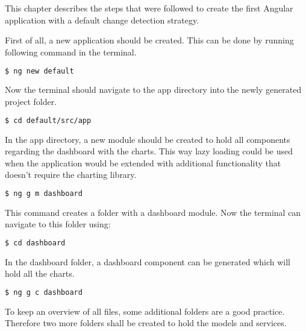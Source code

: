 
\chapter{}
\label{ch:default}

This chapter describes the steps that were followed to create the first Angular application with a default change detection strategy.

First of all, a new application should be created. This can be done by running following command in the terminal.
\begin{lstlisting}[language=bash]
$ ng new default
\end{lstlisting}

Now the terminal should navigate to the app directory into the newly generated project folder.

\begin{lstlisting}[language=bash]
	$ cd default/src/app
\end{lstlisting}

In the app directory, a new module should be created to hold all components regarding the dashboard with the charts. This way lazy loading could be used when the application would be extended with additional functionality that doesn't require the charting library.

\begin{lstlisting}[language=bash]
	$ ng g m dashboard
\end{lstlisting}

This command creates a folder with a dashboard module. Now the terminal can navigate to this folder using:

\begin{lstlisting}[language=bash]
	$ cd dashboard
\end{lstlisting}

In the dashboard folder, a dashboard component can be generated which will hold all the charts.

\begin{lstlisting}[language=bash]
	$ ng g c dashboard
\end{lstlisting}

To keep an overview of all files, some additional folders are a good practice. Therefore two more folders shall be created to hold the models and services.

